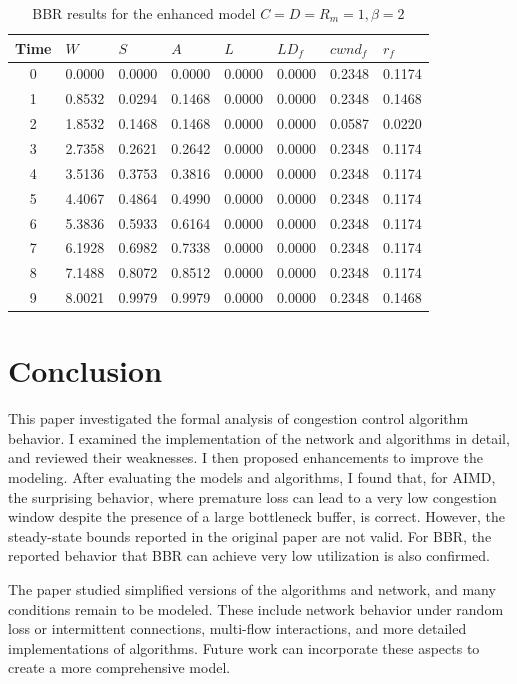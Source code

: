 \documentclass[12pt]{l4dc2023}
\begin{document}
\begin{table}[htbp]
\centering
\begin{tabular}{|c|l|l|l|l|l|l|l|}
\hline
\textbf{Time} & \textbf{$W$} & \textbf{$S$} & \textbf{$A$} & \textbf{$L$} & \textbf{$LD_f$} & \textbf{$cwnd_f$} & \textbf{$r_f$} \\
\hline
0 & 0.0000 & 0.0000 & 0.0000 & 0.0000 & 0.0000 & 0.2348 & 0.1174 \\
1 & 0.8532 & 0.0294 & 0.1468 & 0.0000 & 0.0000 & 0.2348 & 0.1468 \\
2 & 1.8532 & 0.1468 & 0.1468 & 0.0000 & 0.0000 & 0.0587 & 0.0220 \\
3 & 2.7358 & 0.2621 & 0.2642 & 0.0000 & 0.0000 & 0.2348 & 0.1174 \\
4 & 3.5136 & 0.3753 & 0.3816 & 0.0000 & 0.0000 & 0.2348 & 0.1174 \\
5 & 4.4067 & 0.4864 & 0.4990 & 0.0000 & 0.0000 & 0.2348 & 0.1174 \\
6 & 5.3836 & 0.5933 & 0.6164 & 0.0000 & 0.0000 & 0.2348 & 0.1174 \\
7 & 6.1928 & 0.6982 & 0.7338 & 0.0000 & 0.0000 & 0.2348 & 0.1174 \\
8 & 7.1488 & 0.8072 & 0.8512 & 0.0000 & 0.0000 & 0.2348 & 0.1174 \\
9 & 8.0021 & 0.9979 & 0.9979 & 0.0000 & 0.0000 & 0.2348 & 0.1468 \\
\hline
\end{tabular}
\caption{BBR results for the enhanced model $C=D=R_m=1, \beta=2$}
\label{tab:bbr_2}
\end{table}

\section{Conclusion} \label{conclusion}
This paper investigated the formal analysis of congestion control algorithm behavior. I examined the implementation of the network and algorithms in detail, and reviewed their weaknesses. I then proposed enhancements to improve the modeling. After evaluating the models and algorithms, I found that, for AIMD, the surprising behavior, where premature loss can lead to a very low congestion window despite the presence of a large bottleneck buffer, is correct. However, the steady-state bounds reported in the original paper are not valid. For BBR, the reported behavior that BBR can achieve very low utilization is also confirmed.

The paper studied simplified versions of the algorithms and network, and many conditions remain to be modeled. These include network behavior under random loss or intermittent connections, multi-flow interactions, and more detailed implementations of algorithms. Future work can incorporate these aspects to create a more comprehensive model.


\end{document}
